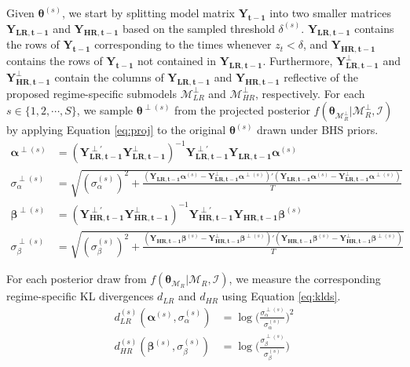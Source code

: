 Given $\bm{\theta}^{(s)}$, we start by splitting model matrix $\bm{Y_{t-1}}$ into two smaller matrices $\bm{Y_{LR,t-1}}$ and $\bm{Y_{HR,t-1}}$ based on the sampled threshold $\delta^{(s)}$. $\bm{Y_{LR,t-1}}$ contains the rows of $\bm{Y_{t-1}}$ corresponding to the times whenever $z_t<\delta$, and $\bm{Y_{HR,t-1}}$ contains the rows of  $\bm{Y_{t-1}}$ not contained in $\bm{Y_{LR,t-1}}$. Furthermore, $\bm{Y^{\perp}_{LR,t-1}}$ and $\bm{Y^{\perp}_{HR,t-1}}$ contain the columns of $\bm{Y_{LR,t-1}}$ and $\bm{Y_{HR,t-1}}$ reflective of the proposed regime-specific submodels $\mathcal{M}^\perp_{LR}$ and $\mathcal{M}^\perp_{HR}$, respectively. For each $s \in \{1,2,\cdots,S\}$, we sample $\bm{\theta}^{\perp(s)}$ from the  projected posterior $f(\bm{\theta}_{\mathcal{M}^\perp_R}|\mathcal{M}^\perp_R,\mathcal{I})$ by applying Equation \ref{eq:proj} to the original $\bm{\theta}^{(s)}$ drawn under BHS priors.
\begin{equation}
\label{eq:proj}
\begin{split}
\bm{\alpha}^{\perp(s)}&=(\bm{Y^{\perp'}_{LR,t-1}}\bm{Y^{\perp}_{LR,t-1}})^{-1} \bm{Y^{\perp'}_{LR,t-1}}     \bm{Y_{LR,t-1}}\bm{\alpha}^{(s)}\\
\sigma_\alpha^{\perp(s)}&=\sqrt{(\sigma_\alpha^{(s)})^2+\frac{( \bm{Y_{LR,t-1}}\bm{\alpha}^{(s)}-\bm{Y^\perp_{LR,t-1}}\bm{\alpha}^{\perp(s)})'( \bm{Y_{LR,t-1}}\bm{\alpha}^{(s)}-\bm{Y^\perp_{LR,t-1}}\bm{\alpha}^{\perp(s)})}{T}                                  }\\
\bm{\beta}^{\perp(s)}&=(\bm{Y^{\perp'}_{HR,t-1}}\bm{Y^{\perp}_{HR,t-1}})^{-1} \bm{Y^{\perp'}_{HR,t-1}} \bm{Y_{HR,t-1}}\bm{\beta}^{(s)}\\
\sigma_\beta^{\perp(s)}&=\sqrt{(\sigma_\beta^{(s)})^2+\frac{( \bm{Y_{HR,t-1}}\bm{\beta}^{(s)}-\bm{Y^\perp_{HR,t-1}}\bm{\beta}^{\perp(s)})'( \bm{Y_{HR,t-1}}\bm{\beta}^{(s)}-\bm{Y^\perp_{HR,t-1}}\bm{\beta}^{\perp(s)})}{T}                                   }
\end{split}
\end{equation}

For each posterior draw from $f(\bm{\theta}_{\mathcal{M}_R}|\mathcal{M}_{R},\mathcal{I})$, we measure the corresponding regime-specific KL divergences $d_{LR}$ and $d_{HR}$ using Equation \ref{eq:klds}.
\begin{equation}
\label{eq:klds}
\begin{split}
d^{(s)}_{LR}(\bm{\alpha}^{(s)},\sigma^{(s)}_\alpha)&=\log\bigg(\frac{\sigma^{\perp(s)}_\alpha}{\sigma^{(s)}_\alpha}\bigg)^2\\
d^{(s)}_{HR}(\bm{\beta}^{(s)},\sigma^{(s)}_\beta)&=\log\bigg(\frac{\sigma^{\perp(s)}_\beta}{\sigma^{(s)}_\beta}\bigg)
\end{split}
\end{equation}

